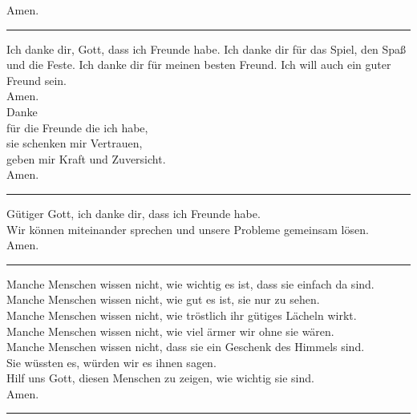Amen.\\
\par\noindent\rule{\textwidth}{0.4pt} \newline \newline
Ich danke dir, Gott, dass ich Freunde habe. Ich danke dir für das Spiel, den Spaß und die Feste. Ich danke dir für meinen besten Freund. Ich will auch ein guter Freund sein. \\ \newline
Amen.\\
\newpage
Danke\\
für die Freunde die ich habe, \\
sie schenken mir Vertrauen, \\
geben mir Kraft und Zuversicht. \\ \newline
Amen.\\
\par\noindent\rule{\textwidth}{0.4pt} \newline \newline
Gütiger Gott, ich danke dir, dass ich Freunde habe.\\ 
Wir können miteinander sprechen und unsere Probleme gemeinsam lösen. \\ \newline
Amen.\\
\par\noindent\rule{\textwidth}{0.4pt} \newline \newline
Manche Menschen wissen nicht, wie wichtig es ist, dass sie einfach da sind. \\
Manche Menschen wissen nicht, wie gut es ist, sie nur zu sehen. \\
Manche Menschen wissen nicht, wie tröstlich ihr gütiges Lächeln wirkt. \\
Manche Menschen wissen nicht, wie viel ärmer wir ohne sie wären. \\
Manche Menschen wissen nicht, dass sie ein Geschenk des Himmels sind.\\ \newline
Sie wüssten es, würden wir es ihnen sagen.\\
Hilf uns Gott, diesen Menschen zu zeigen, wie wichtig sie sind.\\ \newline
Amen.\\
\par\noindent\rule{\textwidth}{0.4pt} \newline \newline
